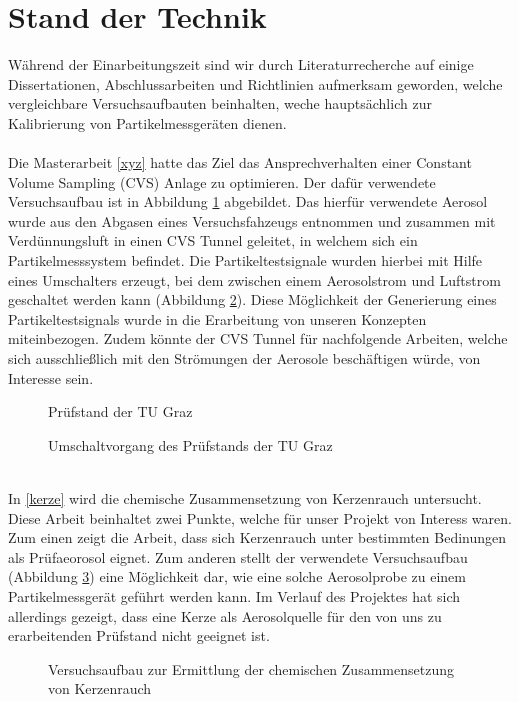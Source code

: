 \section{Stand der Technik}
W\"{a}hrend der Einarbeitungszeit sind wir durch Literaturrecherche auf einige Dissertationen, Abschlussarbeiten und Richtlinien aufmerksam geworden, welche vergleichbare Versuchsaufbauten beinhalten, weche haupts\"{a}chlich zur Kalibrierung von Partikelmessger\"{a}ten dienen.
\\
\\
Die Masterarbeit \ref{xyz} hatte das Ziel das Ansprechverhalten einer Constant Volume Sampling (CVS) Anlage zu optimieren. Der daf\"{u}r verwendete Versuchsaufbau ist in Abbildung \ref{aufbau_graz} abgebildet. Das hierf\"{u}r verwendete Aerosol wurde aus den Abgasen eines Versuchsfahzeugs entnommen und zusammen mit Verd\"{u}nnungsluft in einen CVS Tunnel geleitet, in welchem sich ein Partikelmesssystem befindet. Die Partikeltestsignale wurden hierbei mit Hilfe eines Umschalters erzeugt, bei dem zwischen einem Aerosolstrom und Luftstrom geschaltet werden kann (Abbildung \ref{umschalter_graz}). Diese M\"{o}glichkeit der Generierung eines Partikeltestsignals wurde in die Erarbeitung von unseren Konzepten miteinbezogen. Zudem k\"{o}nnte der CVS Tunnel f\"{u}r nachfolgende Arbeiten, welche sich ausschlie{\ss}lich mit den Str\"{o}mungen der Aerosole besch\"{a}ftigen w\"{u}rde, von Interesse sein.
\\
\begin{figure}
	\centering
	\caption{Pr\"{u}fstand der TU Graz}
	\label{aufbau_graz}
\end{figure}
\begin{figure}
	\centering
	\caption{Umschaltvorgang des Pr\"{u}fstands der TU Graz}
	\label{umschalter_graz}
\end{figure}
\\
In \ref{kerze} wird die chemische Zusammensetzung von Kerzenrauch untersucht. Diese Arbeit beinhaltet zwei Punkte, welche f\"{u}r unser Projekt von Interess waren. Zum einen zeigt die Arbeit, dass sich Kerzenrauch unter bestimmten Bedinungen als Pr\"{u}faeorosol eignet. Zum anderen stellt der verwendete Versuchsaufbau (Abbildung \ref{kerze_exp}) eine M\"{o}glichkeit dar, wie eine solche Aerosolprobe zu einem Partikelmessger\"{a}t gef\"{u}hrt werden kann. Im Verlauf des Projektes hat sich allerdings gezeigt, dass eine Kerze als Aerosolquelle f\"{u}r den von uns zu erarbeitenden Pr\"{u}fstand nicht geeignet ist.
\\ 
\begin{figure}
	\centering
	\caption{Versuchsaufbau zur Ermittlung der chemischen Zusammensetzung von Kerzenrauch}
	\label{kerze_exp}
\end{figure}
